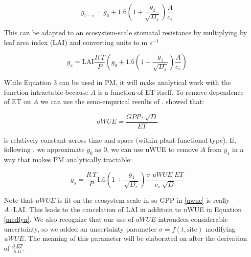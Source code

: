\documentclass[draft,linenumbers]{agujournal}
\begin{document}
\begin{linenomath*}
  \begin{equation}
  g_{l-s} = g_0 + 1.6 \left(1 + \frac{g_1}{\sqrt{D_{s}}}\right) \frac{A}{c_s}
  \end{equation}
\end{linenomath*}

This can be adapted to an ecosystem-scale stomatal resistance by multiplying by leaf area index (LAI) and converting units to m s$^{-1}$

\begin{linenomath*}
  \label{medlyn}
  \begin{equation}
  g_s = \text{LAI} \frac{R \,T}{P} \left( g_0 + 1.6 \left(1 + \frac{g_1}{\sqrt{D_{s}}}\right) \frac{A}{c_s}\right)
  \end{equation}
\end{linenomath*}

While Equation 3 can be used in PM, it will make analytical work with the function intractable because $A$ is a function of ET itself. To remove dependence of ET on $A$ we can use the semi-empirical results of \citet{Zhou_2015}. \citet{Zhou_2015} showed that:

\begin{linenomath*}
  \begin{equation}
    \label{uwue}
uWUE = \frac{GPP \cdot \sqrt{D}}{ET}
  \end{equation}
\end{linenomath*}
is relatively constant across time and space (within plant functional type). If, following \citet{Lin_2015}, we approximate $g_0$ as $0$, we can use uWUE to remove $A$ from $g_s$ in a way that makes PM analytically tractable:

\begin{linenomath*}
  \begin{equation}
  g_s = \frac{R \, T}{P} 1.6 \left(1 + \frac{g_1}{\sqrt{D_{s}}}\right) \frac{\sigma \; uWUE \; ET}{c_s \; \sqrt{D}}
  \end{equation}
\end{linenomath*}

Note that $uWUE$ is fit on the ecosystem scale in \citet{Zhou_2015} so GPP in \ref{uwue} is really $A\cdot \text{LAI}$. This leads to the cancelation of LAI in additoin to uWUE in Equation \ref{medlyn}. We also recognize that our use of $uWUE$ introudces considerable uncertainty, so we added an uncertainty parameter $\sigma = f(t, \text{site})$ modifying $uWUE$. The meaning of this parameter will be elaborated on after the derivation of $\frac{\partial \; ET}{\partial \; D}$.
\end{document}
